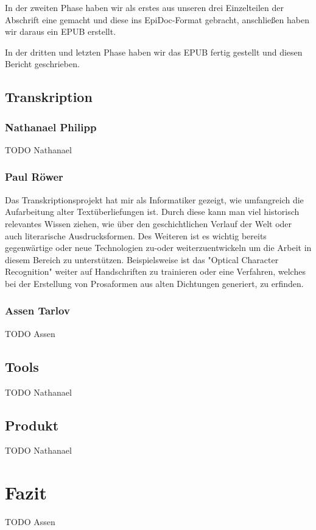 \documentclass[a4paper, 12pt, oneside]{scrbook}
\begin{document}
In der zweiten Phase haben wir als erstes aus unseren drei Einzelteilen der Abschrift eine gemacht und diese ins EpiDoc-Format gebracht, anschließen haben wir daraus ein EPUB erstellt.

In der dritten und letzten Phase haben wir das EPUB fertig gestellt und diesen Bericht geschrieben.
\section{Transkription}
\subsection{Nathanael Philipp}
TODO Nathanael
\subsection{Paul Röwer}
Das Transkriptionsprojekt hat mir als Informatiker gezeigt, wie umfangreich die Aufarbeitung alter Textüberliefungen ist. Durch diese kann man viel historisch relevantes Wissen ziehen, wie über den geschichtlichen Verlauf der Welt oder auch literarische Ausdrucksformen. Des Weiteren ist es wichtig bereits gegenwärtige oder neue Technologien  zu-oder weiterzuentwickeln um die Arbeit in diesem Bereich zu unterstützen. Beispielsweise ist das "Optical Character Recognition" weiter auf Handschriften zu trainieren oder eine Verfahren, welches bei der Erstellung von Prosaformen aus alten Dichtungen generiert, zu erfinden.
\subsection{Assen Tarlov}
TODO Assen
\section{Tools}
TODO Nathanael
\section{Produkt}
TODO Nathanael

\chapter{Fazit}
TODO Assen

\printbibliography
\end{document}
